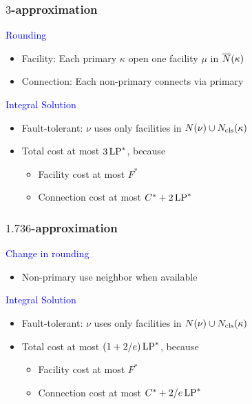 \documentclass[handout, hyperref, dvipsnames]{beamer}
\begin{document}
\begin{frame}
  \frametitle{$3$-approximation}

  {\Large \textcolor{blue}{
  Rounding}}

  \begin{itemize}
  \item Facility: Each primary $\kappa$ open one facility $\mu$ in ${\overline{N}}(\kappa)$
  \item Connection: Each non-primary connects via primary
  \end{itemize}

  \vspace{.3in}
  {\Large \textcolor{blue}{
  Integral Solution}}

  \begin{itemize}
  \item Fault-tolerant: $\nu$ uses only facilities in
    $N(\nu) \cup N_{{\mbox{\scriptsize\rm cls}}}(\kappa)$
  \item Total cost at most $3\,\mbox{\rm LP}^\ast$, because
    \begin{itemize}
    \item Facility cost at most $F^\ast$
    \item Connection cost at most $C^\ast + 2\,\mbox{\rm LP}^\ast$
    \end{itemize}
  \end{itemize}

\end{frame}

\begin{frame}
  \frametitle{$1.736$-approximation} 

  {\Large \textcolor{blue}{
  Change in rounding}}
  \begin{itemize}
  \item Non-primary use neighbor when available
  \end{itemize}

  \vspace{.3in}
  {\Large \textcolor{blue}{
  Integral Solution}}
  \begin{itemize}
  \item Fault-tolerant: $\nu$ uses only facilities in
    $N(\nu) \cup N_{{\mbox{\scriptsize\rm cls}}}(\kappa)$
  \item Total cost at most $(1+2/e)\,\mbox{\rm LP}^\ast$, because
    \begin{itemize}
    \item Facility cost at most $F^\ast$
    \item Connection cost at most $C^\ast + 2/e\, \mbox{\rm LP}^\ast$
    \end{itemize}
  \end{itemize}
\end{frame}
\end{document}
